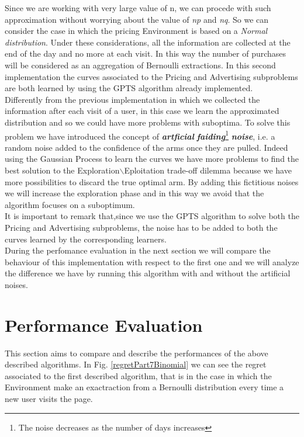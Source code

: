 Since we are working with very large value of n, we can procede with such approximation without worrying about the value of \textit{np} and \textit{nq}.
So we can consider the case in which the pricing Environment is based on a \textit{Normal distribution}. Under these considerations, all the information are collected at the end of the day and no more at each visit. In this way the number of purchases will be considered as an aggregation of Bernoulli extractions.
In this second implementation the curves associated to the Pricing and Advertising subproblems are both learned by using the GPTS algorithm already implemented.\\
Differently from the previous implementation in which we collected the information after each visit of a user, in this case we learn the approximated distribution and so we could have more problems with suboptima. To solve this problem we have introduced the concept of \textbf{\textit{artficial}} \textbf{\textit{faiding}}\footnote{The noise decreases as the number of days increases} \textbf{\textit{noise}}, i.e. a random noise added to the confidence of the arms once they are pulled. Indeed using the Gaussian Process to learn the curves we have more problems to find the best solution to the Exploration$\backslash$Eploitation trade-off dilemma because we have more possibilities to discard the true optimal arm. By adding this fictitious noises we will increase the exploration phase and in this way we avoid that the algorithm focuses on a suboptimum.\\ It is important to remark that,since we use the GPTS algorithm to solve both the Pricing and Advertising subproblems, the noise has to be added to both the curves learned by the corresponding learners.\\ During the perfomance evaluation in the next section we will compare the behaviour of this implementation with respect to the first one and we will analyze the difference we have by running this algorithm with and without the artificial noises.

\section{Performance Evaluation}
This section aims to compare and describe the performances of the above described algorithms. In Fig. \ref{regretPart7Binomial} we can see the regret associated to the first described algorithm, that is in the case in which the Environment make an exactraction from a Bernoulli distribution every time a new user visits the page. 


